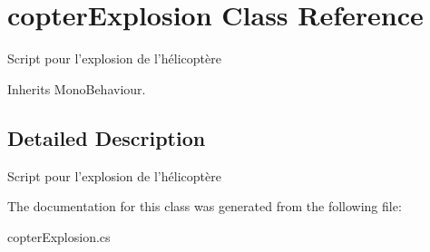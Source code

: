 \hypertarget{classcopter_explosion}{\section{copter\+Explosion Class Reference}
\label{classcopter_explosion}
}


Script pour l'explosion de l'hélicoptère  




Inherits Mono\+Behaviour.



\subsection{Detailed Description}
Script pour l'explosion de l'hélicoptère 



The documentation for this class was generated from the following file\+:\begin{DoxyCompactItemize}
\item 
copter\+Explosion.\+cs\end{DoxyCompactItemize}
